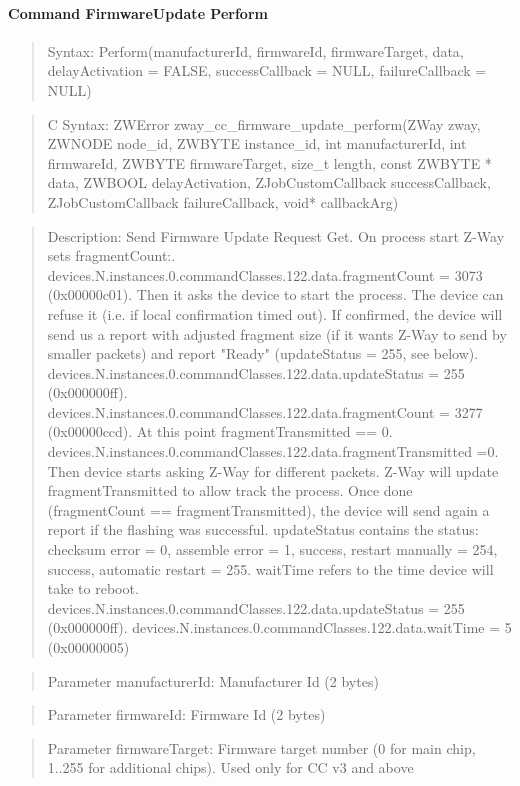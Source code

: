 \paragraph{Command FirmwareUpdate Perform}
\begin{quote}Syntax: Perform(manufacturerId, firmwareId, firmwareTarget, data, delayActivation = FALSE, successCallback = NULL, failureCallback = NULL)\end{quote}
\begin{quote}C Syntax: ZWError zway\_cc\_firmware\_update\_perform(ZWay zway, ZWNODE node\_id, ZWBYTE instance\_id, int manufacturerId, int firmwareId, ZWBYTE firmwareTarget, size\_t length, const ZWBYTE * data, ZWBOOL delayActivation, ZJobCustomCallback successCallback, ZJobCustomCallback failureCallback, void* callbackArg)\end{quote}
\begin{quote}Description: Send Firmware Update Request Get. On process start Z-Way sets fragmentCount:. devices.N.instances.0.commandClasses.122.data.fragmentCount = 3073 (0x00000c01). Then it asks the device to start the process. The device can refuse it (i.e. if local confirmation timed out). If confirmed, the device will send us a report with adjusted fragment size (if it wants Z-Way to send by smaller packets) and report "Ready" (updateStatus = 255, see below). devices.N.instances.0.commandClasses.122.data.updateStatus = 255 (0x000000ff). devices.N.instances.0.commandClasses.122.data.fragmentCount = 3277 (0x00000ccd). At this point fragmentTransmitted == 0. devices.N.instances.0.commandClasses.122.data.fragmentTransmitted =0. Then device starts asking Z-Way for different packets. Z-Way will update fragmentTransmitted to allow track the process. Once done (fragmentCount == fragmentTransmitted), the device will send again a report if the flashing was successful. updateStatus contains the status: checksum error = 0, assemble error = 1, success, restart manually = 254, success, automatic restart = 255. waitTime refers to the time device will take to reboot. devices.N.instances.0.commandClasses.122.data.updateStatus = 255 (0x000000ff). devices.N.instances.0.commandClasses.122.data.waitTime = 5 (0x00000005)\end{quote}
\begin{quote}Parameter manufacturerId: Manufacturer Id (2 bytes)\end{quote}
\begin{quote}Parameter firmwareId: Firmware Id (2 bytes)\end{quote}
\begin{quote}Parameter firmwareTarget: Firmware target number (0 for main chip, 1..255 for additional chips). Used only for CC v3 and above\end{quote}
